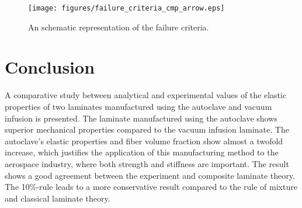 \documentclass{article}
\begin{document}
\begin{table}[H]
    \centering
    \caption{Factor of safety of each load case for the vacuum infusion laminate.}
    \label{tab:sf_vacuum_infusion}
\end{table}

\begin{figure}[h]
    \centering
    \texttt{[image: figures/failure\_criteria\_cmp\_arrow.eps]}
    \caption{An schematic representation of the failure criteria.}
    \label{fig:failure_criteria_cmp_arrow}
\end{figure}

\section{Conclusion}
A comparative study between analytical and experimental values of the elastic properties of two laminates manufactured using the autoclave and vacuum infusion is presented. The laminate manufactured using the autoclave shows superior mechanical properties compared to the vacuum infusion laminate. The autoclave's elastic properties and fiber volume fraction show almost a twofold increase, which justifies the application of this manufacturing method to the aerospace industry, where both strength and stiffness are important. The result shows a good agreement between the experiment and composite laminate theory. The 10\%-rule leads to a more conservative result compared to the rule of mixture and classical laminate theory. 


\newpage


\end{document}
